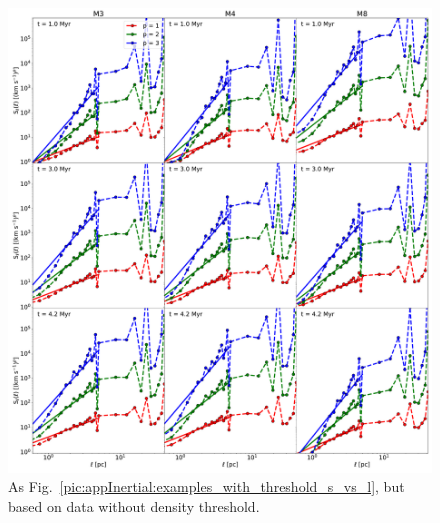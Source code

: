  	
\begin{figure}
    \centering
    \includegraphics[width=\textwidth]{app_examples_woutthres_s_l.pdf}
    \caption{
        As Fig.~\ref{pic:appInertial:examples_with_threshold_s_vs_l}, but based on data without density threshold.
    }
    \label{pic:appInertial:examples_without_threshold_s_vs_l}
\end{figure}
 	
